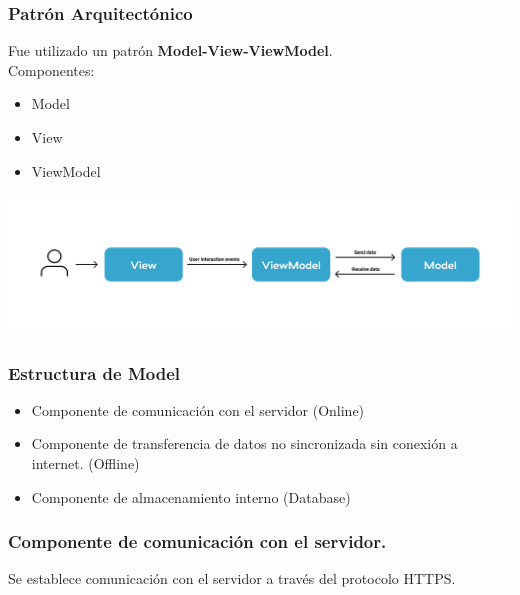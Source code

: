 \documentclass[14pt]{beamer}
\begin{document}
\begin{frame}
\frametitle{Patrón Arquitectónico}

Fue utilizado un patrón \textbf{Model-View-ViewModel}.
\\
Componentes:
\begin{itemize}
\item Model
\item View
\item ViewModel
\end{itemize}

\begin{center}

\includegraphics[scale =0.2]{Images/MVVMwip.png}


\end{center}

\end{frame}





\begin{frame}
\frametitle{Estructura de Model}



\begin{itemize}
\item Componente de comunicación con el servidor (Online)

\item Componente de transferencia de datos no sincronizada sin conexión a internet. (Offline)

\item Componente de almacenamiento interno (Database)

\end{itemize}


\end{frame}

\begin{frame}
\frametitle{Componente de comunicación con el servidor.}

\begin{block}{}
Se establece comunicación con el servidor a través del protocolo HTTPS.
\end{block}

\end{frame}
\end{document}
